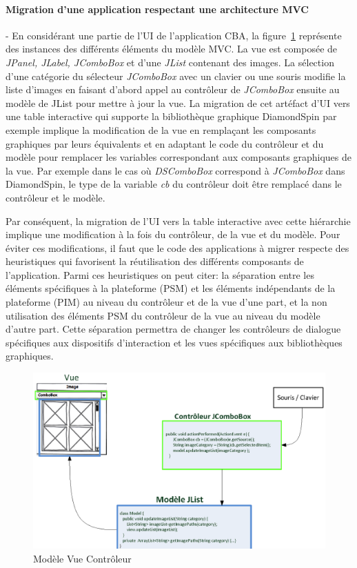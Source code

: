 \paragraph{Migration d'une application respectant une architecture MVC}-
En considérant une partie de l'UI de l'application CBA, la figure~\ref{fig:6} représente des instances des différents éléments du modèle MVC. La vue est composée de \textit{JPanel, JLabel, JComboBox} et d'une \textit{JList} contenant des images. La sélection d'une catégorie du sélecteur \textit{JComboBox}  avec un clavier ou une souris modifie la liste d'images en faisant d'abord appel au contrôleur de \textit{JComboBox} ensuite au modèle de JList pour mettre à jour la vue.
La migration de cet artéfact d'UI vers une table interactive qui supporte la bibliothèque graphique DiamondSpin par exemple implique la modification de la vue en remplaçant les composants graphiques par leurs équivalents et en adaptant le code du contrôleur et du modèle pour remplacer les variables correspondant aux composants graphiques de la vue. Par exemple dans le cas o\`{u} \textit{DSComboBox} correspond à \textit{JComboBox} dans DiamondSpin, le type de la variable \textit{cb} du contr\^{o}leur doit \^{e}tre remplacé dans le contr\^{o}leur et le mod\`{e}le.

Par conséquent, la migration de l'UI vers la table interactive avec cette hiérarchie implique une modification à la fois du contr\^{o}leur, de la vue et du mod\`{e}le. Pour éviter ces modifications, il faut que le code des applications à migrer respecte des heuristiques qui favorisent la réutilisation des différents composants de l'application. Parmi ces heuristiques on peut citer: la séparation entre les éléments spécifiques à la plateforme (PSM) et les éléments indépendants de la plateforme (PIM) au niveau du contr\^{o}leur et de la vue d'une part, et la non utilisation des éléments PSM du contrôleur de la vue au niveau du modèle d'autre part. Cette séparation permettra de changer les contr\^{o}leurs de dialogue spécifiques aux dispositifs d'interaction et les vues spécifiques aux biblioth\`{e}ques graphiques.
\begin{figure}[h]
\begin{center}
\includegraphics[width=432pt]{chap2/img-2.eps}
\caption{Modèle Vue Contrôleur}\label{fig:6}
\end{center}
\end{figure}

